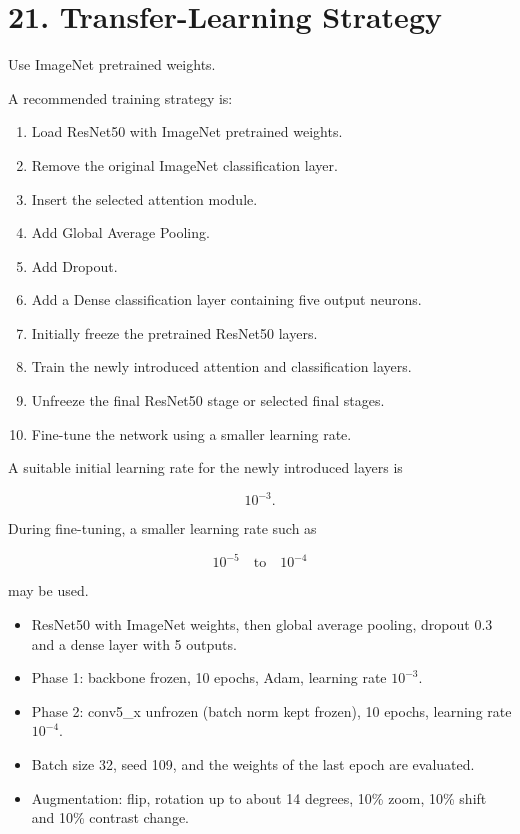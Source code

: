 \documentclass[10pt]{article}
\begin{document}
\section*{21. Transfer-Learning Strategy}

Use ImageNet pretrained weights.

A recommended training strategy is:

\begin{enumerate}

\item Load ResNet50 with ImageNet pretrained weights.

\item Remove the original ImageNet classification layer.

\item Insert the selected attention module.

\item Add Global Average Pooling.

\item Add Dropout.

\item Add a Dense classification layer containing five output neurons.

\item Initially freeze the pretrained ResNet50 layers.

\item Train the newly introduced attention and classification layers.

\item Unfreeze the final ResNet50 stage or selected final stages.

\item Fine-tune the network using a smaller learning rate.

\end{enumerate}

A suitable initial learning rate for the newly introduced layers is

\[
10^{-3}.
\]

During fine-tuning, a smaller learning rate such as

\[
10^{-5}
\quad\text{to}\quad
10^{-4}
\]

may be used.

\begin{itemize}
\item ResNet50 with ImageNet weights, then global average pooling, dropout 0.3 and a dense layer with 5 outputs.
\item Phase 1: backbone frozen, 10 epochs, Adam, learning rate $10^{-3}$.
\item Phase 2: conv5\_x unfrozen (batch norm kept frozen), 10 epochs, learning rate $10^{-4}$.
\item Batch size 32, seed 109, and the weights of the last epoch are evaluated.
\item Augmentation: flip, rotation up to about 14 degrees, 10\% zoom, 10\% shift and 10\% contrast change.
\end{itemize}
\end{document}

